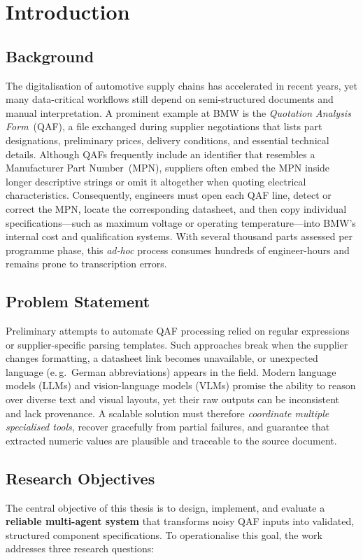 \section{Introduction}
\label{sec:intro}

\subsection{Background}
The digitalisation of automotive supply chains has accelerated in recent years, yet many data-critical workflows still depend on semi-structured documents and manual interpretation.  
A prominent example at BMW is the \emph{Quotation Analysis Form}~(QAF), a file exchanged during supplier negotiations that lists part designations, preliminary prices, delivery conditions, and essential technical details.  
Although QAFs frequently include an identifier that resembles a Manufacturer Part Number~(MPN), suppliers often embed the MPN inside longer descriptive strings or omit it altogether when quoting electrical characteristics.  
Consequently, engineers must open each QAF line, detect or correct the MPN, locate the corresponding datasheet, and then copy individual specifications—such as maximum voltage or operating temperature—into BMW’s internal cost and qualification systems.  
With several thousand parts assessed per programme phase, this \emph{ad-hoc} process consumes hundreds of engineer-hours and remains prone to transcription errors.

\subsection{Problem Statement}
Preliminary attempts to automate QAF processing relied on regular expressions or supplier-specific parsing templates.  
Such approaches break when the supplier changes formatting, a datasheet link becomes unavailable, or unexpected language (e.\,g.\ German abbreviations) appears in the field.  
Modern language models (LLMs) and vision-language models (VLMs) promise the ability to reason over diverse text and visual layouts, yet their raw outputs can be inconsistent and lack provenance.  
A scalable solution must therefore \emph{coordinate multiple specialised tools}, recover gracefully from partial failures, and guarantee that extracted numeric values are plausible and traceable to the source document.

\subsection{Research Objectives}
The central objective of this thesis is to design, implement, and evaluate a \textbf{reliable multi-agent system} that transforms noisy QAF inputs into validated, structured component specifications.  
To operationalise this goal, the work addresses three research questions:

